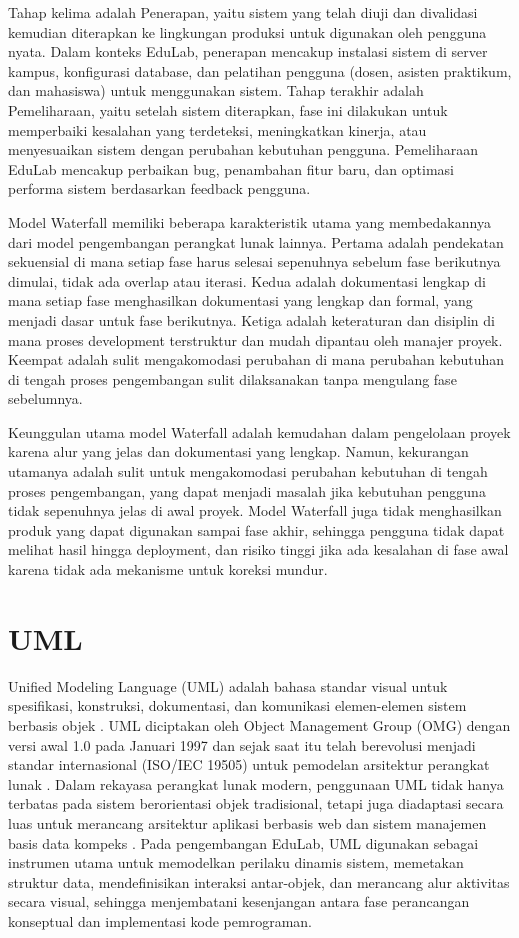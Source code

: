 \documentclass[12pt,a4paper,twoside]{report}
\begin{document}
Tahap kelima adalah Penerapan, yaitu sistem yang telah diuji dan divalidasi kemudian diterapkan ke lingkungan produksi untuk digunakan oleh pengguna nyata. Dalam konteks EduLab, penerapan mencakup instalasi sistem di server kampus, konfigurasi database, dan pelatihan pengguna (dosen, asisten praktikum, dan mahasiswa) untuk menggunakan sistem. Tahap terakhir adalah Pemeliharaan, yaitu setelah sistem diterapkan, fase ini dilakukan untuk memperbaiki kesalahan yang terdeteksi, meningkatkan kinerja, atau menyesuaikan sistem dengan perubahan kebutuhan pengguna. Pemeliharaan EduLab mencakup perbaikan bug, penambahan fitur baru, dan optimasi performa sistem berdasarkan feedback pengguna.

Model Waterfall memiliki beberapa karakteristik utama yang membedakannya dari model pengembangan perangkat lunak lainnya. Pertama adalah pendekatan sekuensial di mana setiap fase harus selesai sepenuhnya sebelum fase berikutnya dimulai, tidak ada overlap atau iterasi. Kedua adalah dokumentasi lengkap di mana setiap fase menghasilkan dokumentasi yang lengkap dan formal, yang menjadi dasar untuk fase berikutnya. Ketiga adalah keteraturan dan disiplin di mana proses development terstruktur dan mudah dipantau oleh manajer proyek. Keempat adalah sulit mengakomodasi perubahan di mana perubahan kebutuhan di tengah proses pengembangan sulit dilaksanakan tanpa mengulang fase sebelumnya.

Keunggulan utama model Waterfall adalah kemudahan dalam pengelolaan proyek karena alur yang jelas dan dokumentasi yang lengkap. Namun, kekurangan utamanya adalah sulit untuk mengakomodasi perubahan kebutuhan di tengah proses pengembangan, yang dapat menjadi masalah jika kebutuhan pengguna tidak sepenuhnya jelas di awal proyek. Model Waterfall juga tidak menghasilkan produk yang dapat digunakan sampai fase akhir, sehingga pengguna tidak dapat melihat hasil hingga deployment, dan risiko tinggi jika ada kesalahan di fase awal karena tidak ada mekanisme untuk koreksi mundur.

\section{UML}

Unified Modeling Language (UML) adalah bahasa standar visual untuk spesifikasi, konstruksi, dokumentasi, dan komunikasi elemen-elemen sistem berbasis objek \cite{booch2005}. UML diciptakan oleh Object Management Group (OMG) dengan versi awal 1.0 pada Januari 1997 dan sejak saat itu telah berevolusi menjadi standar internasional (ISO/IEC 19505) untuk pemodelan arsitektur perangkat lunak \cite{fowler2004}. Dalam rekayasa perangkat lunak modern, penggunaan UML tidak hanya terbatas pada sistem berorientasi objek tradisional, tetapi juga diadaptasi secara luas untuk merancang arsitektur aplikasi berbasis web dan sistem manajemen basis data kompeks \cite{conallen1999}. Pada pengembangan EduLab, UML digunakan sebagai instrumen utama untuk memodelkan perilaku dinamis sistem, memetakan struktur data, mendefinisikan interaksi antar-objek, dan merancang alur aktivitas secara visual, sehingga menjembatani kesenjangan antara fase perancangan konseptual dan implementasi kode pemrograman.
\end{document}

